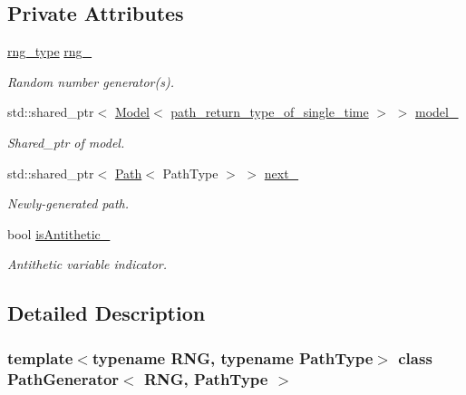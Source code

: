 \subsection*{Private Attributes}
\begin{DoxyCompactItemize}
\item 
\hyperlink{class_path_generator_a7e71cbb5376b07b319b1f042a1035335}{rng\+\_\+type} \hyperlink{class_path_generator_a9a6ba7393db535890497b21b46bdfe67}{rng\+\_\+}
\begin{DoxyCompactList}\small\item\em Random number generator(s). \end{DoxyCompactList}\item 
std\+::shared\+\_\+ptr$<$ \hyperlink{class_model}{Model}$<$ \hyperlink{class_path_generator_a467bc3ddaa5e9104170550617e767349}{path\+\_\+return\+\_\+type\+\_\+of\+\_\+single\+\_\+time} $>$ $>$ \hyperlink{class_path_generator_a92eef9405a03784534b561f56080ed8b}{model\+\_\+}
\begin{DoxyCompactList}\small\item\em Shared\+\_\+ptr of model. \end{DoxyCompactList}\item 
std\+::shared\+\_\+ptr$<$ \hyperlink{class_path}{Path}$<$ Path\+Type $>$ $>$ \hyperlink{class_path_generator_a2a085e303b74fbc34f12161eed56c331}{next\+\_\+}
\begin{DoxyCompactList}\small\item\em Newly-\/generated path. \end{DoxyCompactList}\item 
bool \hyperlink{class_path_generator_a936af20e588195ca95d02cc302ea5d8b}{is\+Antithetic\+\_\+}
\begin{DoxyCompactList}\small\item\em Antithetic variable indicator. \end{DoxyCompactList}\end{DoxyCompactItemize}


\subsection{Detailed Description}
\subsubsection*{template$<$typename R\+NG, typename Path\+Type$>$\newline
class Path\+Generator$<$ R\+N\+G, Path\+Type $>$}

